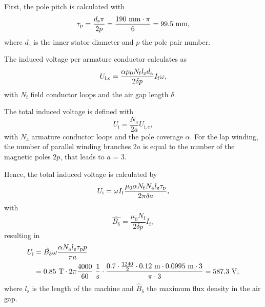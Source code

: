 \begin{solutionblock}
    First, the pole pitch is calculated with
    \begin{equation}
        \taup = \frac{d_{\mathrm{s}} \pi}{2 p}
        = \frac{190 \ \si{mm} \cdot \pi}{6}
        = 99.5 \ \si{mm},
    \end{equation}
    where $d_{\mathrm{s}}$ is the inner stator diameter and $p$ the pole pair number.

    The induced voltage per armature conductor calculates as
    \begin{equation}
        U_{\mathrm{i,c}} = \frac{\alpha\mu_{\mathrm{0}} N_{\mathrm{f}} \lz d_{\mathrm{a}}}{2 \delta p} I_{\mathrm{f}} \omega,
    \end{equation}
    with $N_{\mathrm{f}}$ field conductor loops and the air gap length $\delta$.

    The total induced voltage is defined with
    \begin{equation}
        U_{\mathrm{i}} = \frac{N_{\mathrm{a}}}{2a} U_{\mathrm{i,c}},
    \end{equation}
    with $N_{\mathrm{a}}$ armature conductor loops and the pole coverage $\alpha$.
    For the lap winding, the number of parallel winding branches $2a$ is equal to the number of the magnetic poles $2p$, that leads to $a$ = 3.
    
    Hence, the total induced voltage is calculated by
    \begin{equation}
        U_{\mathrm{i}} = \omega I_{\mathrm{f}} \frac{\mu_{\mathrm{0}} \alpha N_{\mathrm{f}} N_{\mathrm{a}} \lz \taup}{2 \pi \delta a},
    \end{equation}
    with
    \begin{equation}
        \hat{B_{\updelta}} = \frac{\mu_{\mathrm{0}} N_{\mathrm{f}}}{2 \delta p} I_{\mathrm{f}},
        \label{eq:B_hat_task1}
    \end{equation}
    resulting in
    \begin{align}
        \begin{split}
            U_{\mathrm{i}} &= \hat{B_{\updelta}} \omega \frac{\alpha N_{\mathrm{a}} \lz \taup p}{\pi a}\\
            &= 0.85 \ \si{T} \cdot 2\pi \frac{4000}{60} \ \si{\frac{1}{s}} \cdot \frac{0.7 \cdot \frac{1240}{2} \cdot 0.12 \ \si{m} \cdot 0.0995 \ \si{m} \cdot 3}{\pi \cdot 3}
            = 587.3 \ \si{V},
        \end{split}
    \end{align}
    where $l_{\mathrm{z}}$ is the length of the machine and $\hat{B}_{\updelta}$ the maximum flux density in the air gap.
    

\end{solutionblock}




